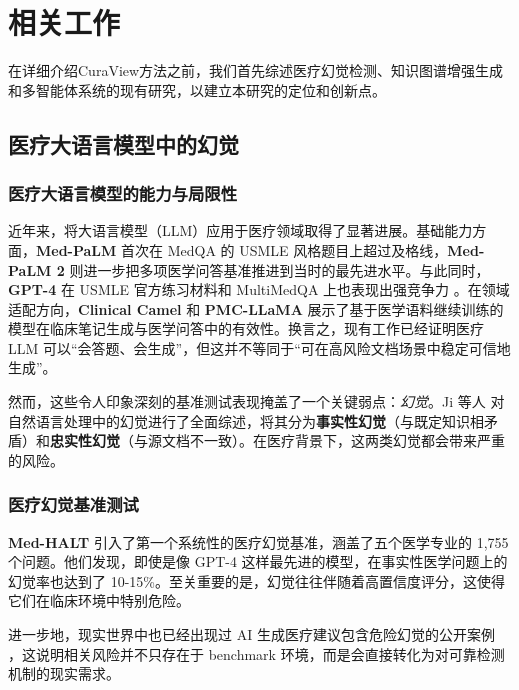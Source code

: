 \documentclass[11pt]{article}
\begin{document}
\section{相关工作}
在详细介绍CuraView方法之前，我们首先综述医疗幻觉检测、知识图谱增强生成和多智能体系统的现有研究，以建立本研究的定位和创新点。

\subsection{医疗大语言模型中的幻觉}

\subsubsection{医疗大语言模型的能力与局限性}

近年来，将大语言模型（LLM）应用于医疗领域取得了显著进展。基础能力方面，\textbf{Med-PaLM} \citep{singhal2023clinicalKnowledge} 首次在 MedQA 的 USMLE 风格题目上超过及格线，\textbf{Med-PaLM 2} \citep{singhal2023expertMedicalQA} 则进一步把多项医学问答基准推进到当时的最先进水平。与此同时，\textbf{GPT-4} 在 USMLE 官方练习材料和 MultiMedQA 上也表现出强竞争力 \citep{nori2023gpt4Medical}。在领域适配方向，\textbf{Clinical Camel} \citep{toma2023clinicalCamel} 和 \textbf{PMC-LLaMA} \citep{wu2023pmcLLaMA} 展示了基于医学语料继续训练的模型在临床笔记生成与医学问答中的有效性。换言之，现有工作已经证明医疗 LLM 可以``会答题、会生成''，但这并不等同于``可在高风险文档场景中稳定可信地生成''。

然而，这些令人印象深刻的基准测试表现掩盖了一个关键弱点：\emph{幻觉}。Ji 等人 \citep{ji2023hallucinationSurvey} 对自然语言处理中的幻觉进行了全面综述，将其分为\textbf{事实性幻觉}（与既定知识相矛盾）和\textbf{忠实性幻觉}（与源文档不一致）。在医疗背景下，这两类幻觉都会带来严重的风险。

\subsubsection{医疗幻觉基准测试}

\textbf{Med-HALT} \citep{pal2023medHalt} 引入了第一个系统性的医疗幻觉基准，涵盖了五个医学专业的 1,755 个问题。他们发现，即使是像 GPT-4 这样最先进的模型，在事实性医学问题上的幻觉率也达到了 10-15\%。至关重要的是，幻觉往往伴随着高置信度评分，这使得它们在临床环境中特别危险。

进一步地，现实世界中也已经出现过 AI 生成医疗建议包含危险幻觉的公开案例 \citep{pal2023medHalt,ji2023hallucinationSurvey}，这说明相关风险并不只存在于 benchmark 环境，而是会直接转化为对可靠检测机制的现实需求。
\end{document}
